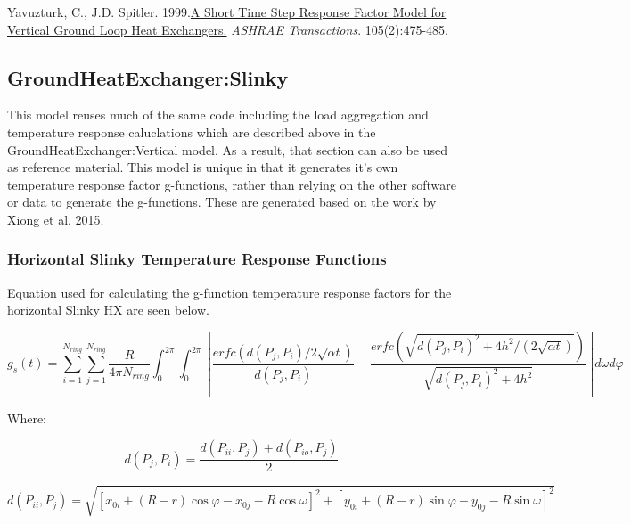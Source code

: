 Yavuzturk, C., J.D. Spitler. 1999.\href{http://www.hvac.okstate.edu/research/Documents/ASHRAE/Yavuzturk_Spitler_99.pdf}{A Short Time Step Response Factor Model for Vertical Ground Loop Heat Exchangers.} \emph{ASHRAE Transactions}. 105(2):475-485.

\subsection{GroundHeatExchanger:Slinky}\label{groundheatexchangerslinky}

This model reuses much of the same code including the load aggregation and temperature response caluclations which are described above in the GroundHeatExchanger:Vertical model. As a result, that section can also be used as reference material. This model is unique in that it generates it's own temperature response factor g-functions, rather than relying on the other software or data to generate the g-functions. These are generated based on the work by Xiong et al. 2015.

\subsubsection{Horizontal Slinky Temperature Response Functions}\label{horizontal-slinky-temperature-response-functions}

Equation used for calculating the g-function temperature response factors for the horizontal Slinky HX are seen below.

{\scriptsize
\begin{equation}
g_s\left(t\right) = \sum_{i = 1}^{N_{ring}} \sum_{j = 1}^{N_{ring}} \frac{R}{4\pi N_{ring}} \int_0^{2\pi} \int_0^{2\pi} 
            \left[ 
                \frac{erfc\left(d\left(P_j,P_i\right)/2\sqrt{\alpha t}\right)}{d\left(P_j,P_i\right)} - 
                \frac{erfc\left(\sqrt{d\left(P_j,P_i\right)^2+4h^2/\left(2\sqrt{\alpha t}\right)}\right)}{\sqrt{d\left(P_j,P_i\right)^2+4h^2} }
            \right]d\omega d\varphi
\end{equation}}

Where:

\begin{equation}
d\left(P_j,P_i\right) = \frac{d\left(P_{ii},P_j\right) + d\left(P_{io},P_j\right)}{2}
\end{equation}

\begin{equation}
d\left(P_{ii},P_j\right) = \sqrt{\left[x_{0i} + \left(R-r\right)\cos \varphi - x_{0j}-R\cos \omega\right]^2 + \left[y_{0i} + \left(R-r\right)\sin \varphi - y_{0j}-R\sin \omega\right]^2}
\end{equation}

